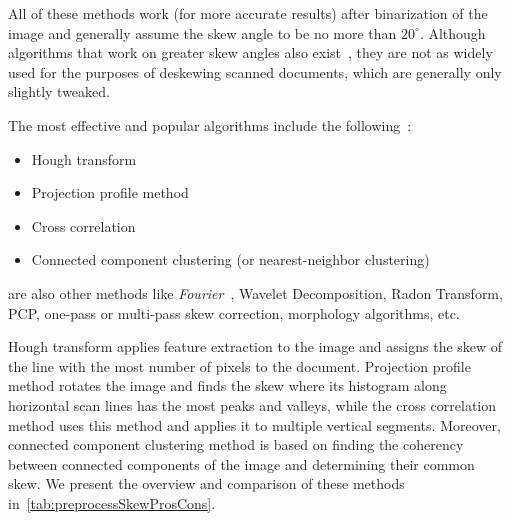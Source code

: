  All of these methods work (for more accurate results) after binarization of the image and generally assume the skew angle to be no more than $20^{\circ}$. Although algorithms that work on greater skew angles also exist~\citep{skewAngleDetection}, they are not as widely used for the purposes of deskewing scanned documents, which are generally only slightly tweaked.

The most effective and popular algorithms include the following~\citep{skewBestTechniques}:
\begin{itemize}
    \item Hough transform~\cite{houghTransform}
    \item Projection profile method~\cite{skewAngleDetection}
    \item Cross correlation~\cite{skewAngleDetection}
    \item Connected component clustering (or nearest-neighbor clustering)~\citep{skewClustering}
\end{itemize}
 are also other methods like \emph{Fourier}~\citep{fourierTransform}, Wavelet Decomposition, Radon Transform, PCP, one-pass or multi-pass skew correction, morphology algorithms, etc.

 Hough transform applies feature extraction to the image and assigns the skew of the line with the most number of pixels to the document. Projection profile method rotates the image and finds the skew where its histogram along horizontal scan lines has the most peaks and valleys, while the cross correlation method uses this method and applies it to multiple vertical segments. Moreover, connected component clustering method is based on finding the coherency between connected components of the image and determining their common skew. We present the overview and comparison of these methods in~\cref{tab:preprocessSkewProsCons}.

